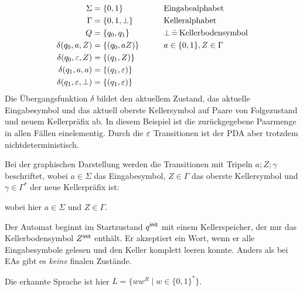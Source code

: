 \begin{Bsp}
\label{bsp:pda-wwr}
        \begin{align}
                \Sigma &= \{0,1\} &\qquad&\text{Eingabealphabet} \notag\\
                \Gamma &= \{0,1,\bot\} &&\text{Kelleralphabet} \notag\\
                Q &= \{q_0,q_1\} &&\bot\,\hat=\,\text{Kellerbodensymbol} \notag\\
                \delta(q_0,a,Z) &= \{(q_0,aZ) \}&& a\in\{0,1\},Z\in\Gamma\\
                \delta(q_0,\varepsilon,Z) &= \{(q_1,Z)\} \label{eq:5.2}\\
                \delta(q_1,a,a) &= \{(q_1,\varepsilon)\}\\
                \delta(q_1,\varepsilon,\bot) &= \{(q_1,\varepsilon)\}
        \end{align}
  Die Übergangsfunktion $\delta$ bildet den aktuellem Zustand, das aktuelle Eingabesymbol und das aktuell oberste Kellersymbol auf Paare von Folgezustand und neuem Kellerpräfix ab.
  In diesem Beispiel ist die zurückgegebene Paarmenge in allen Fällen einelementig.
  Durch die $\varepsilon$ Transitionen ist der PDA aber trotzdem nichtdeterministisch.

  Bei der graphischen Darstellung werden die Transitionen mit Tripeln $a;Z;\gamma$ beschriftet, wobei $a \in \Sigma$ das Eingabesymbol, $Z \in \Gamma$ das oberste Kellersymbol und $\gamma \in \Gamma^*$ der neue Kellerpräfix ist:
  \begin{center}
\end{center}
wobei hier $a \in \Sigma$ und $Z \in \Gamma$.

Der Automat beginnt im Startzustand $q^\mathsf{init}$ mit einem Kellerspeicher, der nur das Kellerbodensymbol $Z^\mathsf{init}$ enthält.
Er akzeptiert ein Wort, wenn er alle Eingabesymbole gelesen und den Keller komplett leeren konnte.
Anders als bei EAs gibt es \emph{keine} finalen Zustände.

Die erkannte Sprache ist hier $L=\{ww^R \mid w\in\{0,1\}^*\}$.
\end{Bsp}

